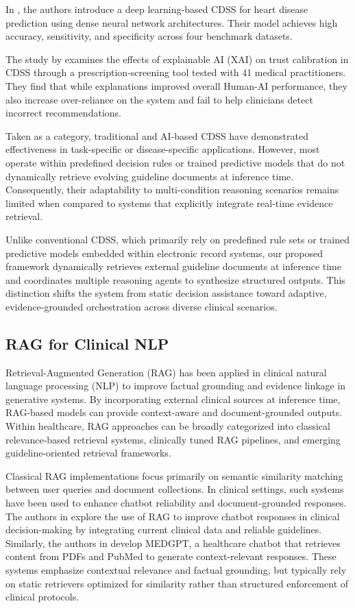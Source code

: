 \documentclass[preprint,12pt]{elsarticle}
\begin{document}
In \cite{r12}, the authors introduce a deep learning-based CDSS for heart disease prediction using dense neural network architectures. Their model achieves high accuracy, sensitivity, and specificity across four benchmark datasets.

The study by \cite{r14} examines the effects of explainable AI (XAI) on trust calibration in CDSS through a prescription-screening tool tested with 41 medical practitioners. They find that while explanations improved overall Human-AI performance, they also increase over-reliance on the system and fail to help clinicians detect incorrect recommendations.

Taken as a category, traditional and AI-based CDSS have demonstrated effectiveness in task-specific or disease-specific applications. However, most operate within predefined decision rules or trained predictive models that do not dynamically retrieve evolving guideline documents at inference time. Consequently, their adaptability to multi-condition reasoning scenarios remains limited when compared to systems that explicitly integrate real-time evidence retrieval.

Unlike conventional CDSS, which primarily rely on predefined rule sets or trained predictive models embedded within electronic record systems, our proposed framework dynamically retrieves external guideline documents at inference time and coordinates multiple reasoning agents to synthesize structured outputs. This distinction shifts the system from static decision assistance toward adaptive, evidence-grounded orchestration across diverse clinical scenarios.



\subsection{RAG for Clinical NLP}

Retrieval-Augmented Generation (RAG) has been applied in clinical natural language processing (NLP) to improve factual grounding and evidence linkage in generative systems. By incorporating external clinical sources at inference time, RAG-based models can provide context-aware and document-grounded outputs. Within healthcare, RAG approaches can be broadly categorized into classical relevance-based retrieval systems, clinically tuned RAG pipelines, and emerging guideline-oriented retrieval frameworks.


Classical RAG implementations focus primarily on semantic similarity matching between user queries and document collections. In clinical settings, such systems have been used to enhance chatbot reliability and document-grounded responses. The authors in \cite{r15} explore the use of RAG to improve chatbot responses in clinical decision-making by integrating current clinical data and reliable guidelines. Similarly, the authors in \cite{r16} develop MEDGPT, a healthcare chatbot that retrieves content from PDFs and PubMed to generate context-relevant responses. These systems emphasize contextual relevance and factual grounding, but typically rely on static retrievers optimized for similarity rather than structured enforcement of clinical protocols.
\end{document}

